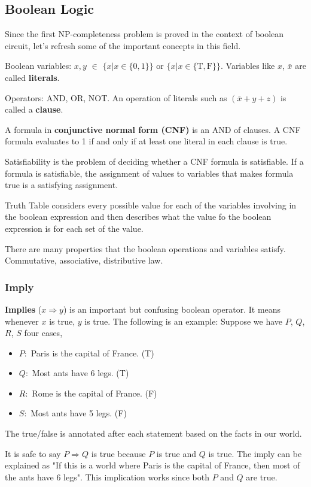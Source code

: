 \subsection{Boolean Logic}
Since the first NP-completeness problem is proved in the context of boolean circuit, let's refresh some of the important concepts in this field.

Boolean variables: $x, y$ $\in$ $\{x| x \in \{0, 1\}\}$ or $\{x| x \in \{\text{T}, \text{F}\}\}$. Variables like $x$, $\bar{x}$ are called \textbf{literals}.

Operators: AND, OR, NOT. An operation of literals such as $(\bar{x} + y + z)$ is called a \textbf{clause}.

A formula in \textbf{conjunctive normal form (CNF)} is an AND of clauses. A CNF formula evaluates to 1 if and only if at least one literal in each clause is true.

Satisfiability is the problem of deciding whether a CNF formula is satisfiable. If a formula is satisfiable, the assignment of values to variables that makes formula true is a satisfying assignment.

Truth Table considers every possible value for each of the variables involving in the boolean expression and then describes what the value fo the boolean expression is for each set of the value.  

There are many properties that the boolean operations and variables satisfy.
Commutative, associative, distributive law.
\subsubsection{Imply}
\textbf{Implies} ($x \Rightarrow y$) is an important but confusing boolean operator. It means whenever $x$ is true, $y$ is true. The following is an example:
Suppose we have $P$, $Q$, $R$, $S$ four cases,
\begin{itemize}
	\item $P:$ Paris is the capital of France. (T)
	\item $Q:$ Most ants have 6 legs.  (T)
	\item $R:$ Rome is the capital of France. (F)
	\item $S:$ Most ants have 5 legs. (F)
\end{itemize}
The true/false is annotated after each statement based on the facts in our world.

It is safe to say $P \Rightarrow Q$ is true because $P$ is true and $Q$ is true. The imply can be explained as "If this is a world where Paris is the capital of France, then most of the ants have 6 legs". This implication works since both $P$ and $Q$ are true.

